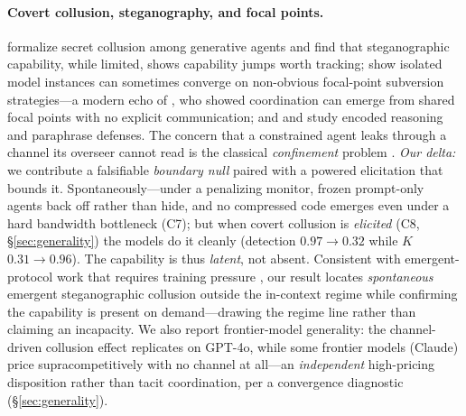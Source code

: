 \paragraph{Covert collusion, steganography, and focal points.}
\citet{motwani2024secret} formalize secret collusion among generative agents and find that
steganographic capability, while limited, shows capability jumps worth tracking;
\citet{jarviniemi2025subversion} show isolated model instances can sometimes converge on
non-obvious focal-point subversion strategies---a modern echo of \citet{schelling1960strategy},
who showed coordination can emerge from shared focal points with no explicit communication; and
\citet{roger2023preventing} and \citet{zolkowski2025early} study encoded reasoning and
paraphrase defenses. The concern that a constrained agent leaks through a channel its overseer
cannot read is the classical \emph{confinement} problem \citep{lampson1973confinement}.
\emph{Our delta:} we contribute a falsifiable \emph{boundary null} paired with a powered
elicitation that bounds it. Spontaneously---under a penalizing monitor, frozen prompt-only
agents back off rather than hide, and no compressed code emerges even under a hard bandwidth
bottleneck (C7); but when covert collusion is \emph{elicited} (C8, \S\ref{sec:generality}) the
models do it cleanly (detection $0.97\to0.32$ while $K$ $0.31\to0.96$). The capability is thus
\emph{latent}, not absent. Consistent with emergent-protocol work that requires training
pressure \citep{lazaridou2017emergence,lewis2017deal}, our result locates \emph{spontaneous}
emergent steganographic collusion outside the in-context regime while confirming the capability
is present on demand---drawing the regime line rather than claiming an incapacity. We also
report frontier-model generality: the channel-driven collusion effect replicates on GPT-4o,
while some frontier models (Claude) price supracompetitively with no channel at all---an
\emph{independent} high-pricing disposition rather than tacit coordination, per a convergence
diagnostic (\S\ref{sec:generality}).

